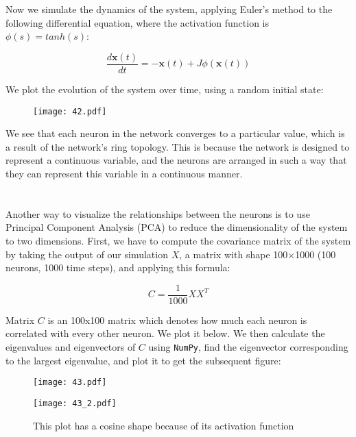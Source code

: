\documentclass{article}
\begin{document}
\newpage
\section{}
Now we simulate the dynamics of the system, applying Euler's method to the following differential equation, where the activation function is $\phi (s) = tanh(s)$: 

\begin{equation}
    \frac{d\boldsymbol{x}(t)}{dt} = -\boldsymbol{x}(t) + J\phi(\boldsymbol{x}(t))
\end{equation}
\vspace{1em}

We plot the evolution of the system over time, using a random initial state:

\begin{figure}[ht]
    \centering
    \texttt{[image: 42.pdf]}
\end{figure}

We see that each neuron in the network converges to a particular value, which is a result of the network's ring topology. This is because the network is designed to represent a continuous variable, and the neurons are arranged in such a way that they can represent this variable in a continuous manner.
\vspace{1em}


\section{}
Another way to visualize the relationships between the neurons is to use Principal Component Analysis (PCA) to reduce the dimensionality of the system to two dimensions. First, we have to compute the covariance matrix of the system by taking the output of our simulation $X$, a matrix with shape 100×1000 (100 neurons, 1000 time steps), and applying this formula:

\begin{equation}
    C = \frac{1}{1000} XX^T
\end{equation}
\vspace{.1em}

Matrix $C$ is an 100x100 matrix which denotes how much each neuron is correlated with every other neuron. We plot it below. We then calculate the eigenvalues and eigenvectors of $C$ using \texttt{NumPy}, find the eigenvector corresponding to the largest eigenvalue, and plot it to get the subsequent figure: 

\begin{figure}[ht]
    \centering
    \begin{minipage}{0.35\textwidth}
        \centering
        \texttt{[image: 43.pdf]}
    \end{minipage}\hfill
    \begin{minipage}{0.55\textwidth}
        \centering
        \texttt{[image: 43\_2.pdf]}
        \caption{This plot has a cosine shape because of its activation function}
    \end{minipage}
\end{figure}
\end{document}
